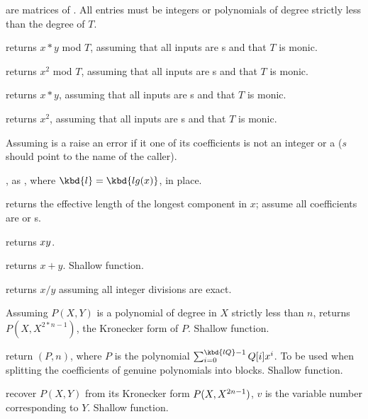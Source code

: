 
 are matrices of . All entries must be integers or
polynomials of degree strictly less than the degree of $T$.

 returns $x*y$ mod $T$, assuming
that all inputs are s and that $T$ is monic.

 returns $x^2$ mod $T$, assuming
that all inputs are s and that $T$ is monic.


 returns $x*y$, assuming
that all inputs are s and that $T$ is monic.

 returns $x^2$, assuming
that all inputs are s and that $T$ is monic.


 Assuming  is a 
raise an error if it one of its coefficients is not an integer or a 
($s$ should point to the name of the caller).

, as , where
$\kbd{l} = \kbd{lg(x)}$, in place.

 returns the effective length of the longest
component in $x$; assume all coefficients are  or s.

 returns $x\*y$.

 returns $x+y$. Shallow function.

 returns $x/y$ assuming all integer
divisions are exact.

 Assuming $P(X,Y)$ is a polynomial
of degree in $X$ strictly less than $n$, returns $P(X,X^{2*n-1})$, the
Kronecker form of $P$. Shallow function.

 return
$(P, n)$, where $P$ is the polynomial
$\sum_{i = 0}^{\kbd{lQ} - 1} Q[i] x^i$. To be used when splitting
the coefficients of genuine polynomials into blocks. Shallow function.

 recover $P(X,Y)$
from its Kronecker form $P(X,X^{2\*n-1})$, $v$ is the variable number
corresponding to $Y$. Shallow function.

